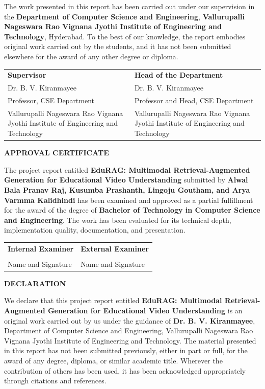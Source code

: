 \documentclass[12pt,a4paper,oneside]{report}
\newcommand{\ProjectTitle}{EduRAG: Multimodal Retrieval-Augmented Generation for Educational Video Understanding}
\newcommand{\InstituteName}{Vallurupalli Nageswara Rao Vignana Jyothi Institute of Engineering and Technology}
\newcommand{\DepartmentName}{Department of Computer Science and Engineering}
\newcommand{\DegreeName}{Bachelor of Technology in Computer Science and Engineering}
\newcommand{\GuideName}{Dr. B. V. Kiranmayee}
\begin{document}
The work presented in this report has been carried out under our supervision in the \textbf{\DepartmentName}, \textbf{\InstituteName}, Hyderabad. To the best of our knowledge, the report embodies original work carried out by the students, and it has not been submitted elsewhere for the award of any other degree or diploma.

\vspace{2cm}
\begin{tabularx}{\textwidth}{X X}
\textbf{Supervisor} & \textbf{Head of the Department} \\
\vspace{1.5cm}\GuideName & \vspace{1.5cm}Dr. B. V. Kiranmayee \\
Professor, CSE Department & Professor and Head, CSE Department \\
\InstituteName & \InstituteName \\
\end{tabularx}

\clearpage
\begin{center}
{\Large \textbf{APPROVAL CERTIFICATE}}
\end{center}

The project report entitled \textbf{\ProjectTitle} submitted by \textbf{Alwal Bala Pranav Raj, Kusumba Prashanth, Lingoju Goutham, and Arya Varmma Kalidhindi} has been examined and approved as a partial fulfillment for the award of the degree of \textbf{\DegreeName}. The work has been evaluated for its technical depth, implementation quality, documentation, and presentation.

\vspace{2.2cm}
\begin{tabularx}{\textwidth}{X X}
\textbf{Internal Examiner} & \textbf{External Examiner} \\
\vspace{1.8cm} & \vspace{1.8cm} \\
Name and Signature & Name and Signature \\
\end{tabularx}

\clearpage
\begin{center}
{\Large \textbf{DECLARATION}}
\end{center}

We declare that this project report entitled \textbf{\ProjectTitle} is an original work carried out by us under the guidance of \textbf{\GuideName}, \DepartmentName, \InstituteName. The material presented in this report has not been submitted previously, either in part or full, for the award of any degree, diploma, or similar academic title. Wherever the contribution of others has been used, it has been acknowledged appropriately through citations and references.
\end{document}
